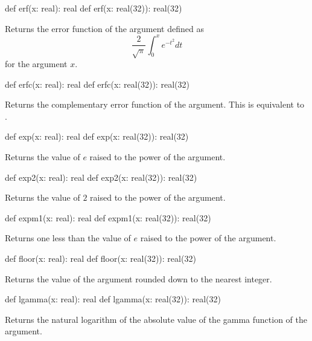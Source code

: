 \begin{protohead}
def erf(x: real): real
def erf(x: real(32)): real(32)
\end{protohead}
\begin{protobody}
Returns the error function of the argument defined as
$$\frac{2}{\sqrt{\pi}}\int^x_0e^{-t^2}dt$$
for the argument $x$.
\end{protobody}

\begin{protohead}
def erfc(x: real): real
def erfc(x: real(32)): real(32)
\end{protohead}
\begin{protobody}
Returns the complementary error function of the argument.  This is
equivalent to .
\end{protobody}

\begin{protohead}
def exp(x: real): real
def exp(x: real(32)): real(32)
\end{protohead}
\begin{protobody}
Returns the value of $e$ raised to the power of the argument.
\end{protobody}

\begin{protohead}
def exp2(x: real): real
def exp2(x: real(32)): real(32)
\end{protohead}
\begin{protobody}
Returns the value of $2$ raised to the power of the argument.
\end{protobody}

\begin{protohead}
def expm1(x: real): real
def expm1(x: real(32)): real(32)
\end{protohead}
\begin{protobody}
Returns one less than the value of $e$ raised to the power of the argument.
\end{protobody}

\begin{protohead}
def floor(x: real): real
def floor(x: real(32)): real(32)
\end{protohead}
\begin{protobody}
Returns the value of the argument rounded down to the nearest integer.
\end{protobody}

\begin{protohead}
def lgamma(x: real): real
def lgamma(x: real(32)): real(32)
\end{protohead}
\begin{protobody}
Returns the natural logarithm of the absolute value of the gamma
function of the argument.
\end{protobody}

